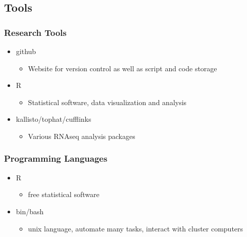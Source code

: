 \documentclass[14pt]{beamer}
\begin{document}
\subsection{Tools}

\begin{frame}
\frametitle{Research Tools}
\begin{itemize}
	\item<1-> github
	\begin{itemize}
	\item<1-> Website for version control as well as script and code storage
	\end{itemize}

	\item<2-> R
	\begin{itemize}
	\item<2-> Statistical software, data visualization and analysis
	\end{itemize}
	
	\item<3-> kallisto/tophat/cufflinks
	\begin{itemize}
	\item<3-> Various RNAseq analysis packages
	\end{itemize}
	
\end{itemize}
\end{frame}

\begin{frame}
\frametitle{Programming Languages}
\begin{itemize}
	\item R
	\begin{itemize}
		\item free statistical software
	\end{itemize}
	\item bin/bash
	\begin{itemize}
		\item unix language, automate many tasks, interact with cluster computers
	\end{itemize}
\end{itemize}
\end{frame}
\end{document}
